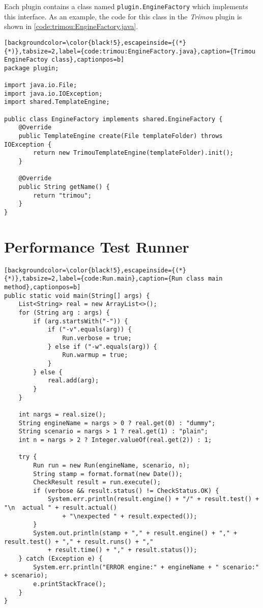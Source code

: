 Each plugin contains a class named \verb!plugin.EngineFactory! which implements this interface.  As an example, the code for this class in the \emph{Trimou} plugin is shown in \autoref{code:trimou:EngineFactory.java}.

\begin{lstlisting}[backgroundcolor=\color{black!5},escapeinside={(*}{*)},tabsize=2,label={code:trimou:EngineFactory.java},caption={Trimou EngineFactoy class},captionpos=b]
package plugin;

import java.io.File;
import java.io.IOException;
import shared.TemplateEngine;

public class EngineFactory implements shared.EngineFactory {
    @Override
    public TemplateEngine create(File templateFolder) throws IOException {
        return new TrimouTemplateEngine(templateFolder).init();
    }

    @Override
    public String getName() {
        return "trimou";
    }
}
\end{lstlisting}

\section*{Performance Test Runner}
\label{appendix:testrunner}

\begin{lstlisting}[backgroundcolor=\color{black!5},escapeinside={(*}{*)},tabsize=2,label={code:Run.main},caption={Run class main method},captionpos=b]
public static void main(String[] args) {
    List<String> real = new ArrayList<>();
    for (String arg : args) {
        if (arg.startsWith("-")) {
            if ("-v".equals(arg)) {
                Run.verbose = true;
            } else if ("-w".equals(arg)) {
                Run.warmup = true;
            }
        } else {
            real.add(arg);
        }
    }

    int nargs = real.size();
    String engineName = nargs > 0 ? real.get(0) : "dummy";
    String scenario = nargs > 1 ? real.get(1) : "plain";
    int n = nargs > 2 ? Integer.valueOf(real.get(2)) : 1;

    try {
        Run run = new Run(engineName, scenario, n);
        String stamp = format.format(new Date());
        CheckResult result = run.execute();
        if (verbose && result.status() != CheckStatus.OK) {
            System.err.println(result.engine() + "/" + result.test() + "\n  actual " + result.actual()
                + "\nexpected " + result.expected());
        }
        System.out.println(stamp + "," + result.engine() + "," + result.test() + "," + result.runs() + ","
            + result.time() + "," + result.status());
    } catch (Exception e) {
        System.err.println("ERROR engine:" + engineName + " scenario:" + scenario);
        e.printStackTrace();
    }
}
\end{lstlisting}

